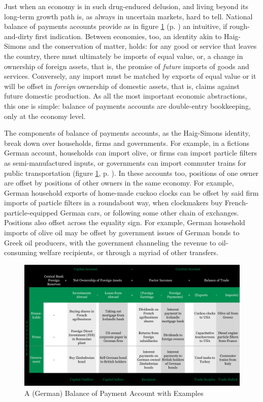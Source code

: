 \documentclass[11pt,a4paper,oneside,openright]{article}
\begin{document}
Just when an economy is in such drug-enduced delusion, and living beyond its long-term growth path is, as always in uncertain markets, hard to tell. 
National balance of payments accounts provide as in figure \ref{fig:balance-of-payments} (p. \pageref{fig:balance-of-payments}) an intuitive, if rough-and-dirty first indication. 
Between economies, too, an identity akin to Haig-Simons and the conservation of matter, holds: 
for any good or service that leaves the country, there must ultimately be imports of equal value, or, a change in ownership of foreign assets, that is, the promise of \emph{future} imports of goods and services. 
Conversely, any import must be matched by exports of equal value or it will be offset in \emph{foreign} ownership of domestic assets, that is, claims against future domestic production. 
As all the most important economic abstractions, this one is simple: 
balance of payments accounts are double-entry bookkeeping, only at the economy level.  

The components of balance of payments accounts, as the Haig-Simons identity, break down over households, firms and governments. 
For example, in a fictions German account, households can import olive, or firms can import particle filters as semi-manufactured inputs, or governments can import commuter trains for public transportation (figure \ref{fig:balance-of-payments}, p. \pageref{fig:balance-of-payments}). 
In these accounts too, positions of one owner are offset by positions of other owners in the same economy. 
For example, German household exports of home-made cuckoo clocks can be offset by said firm imports of particle filters in a roundabout way, when clockmakers buy French-particle-equipped German cars, or following some other chain of exchanges. 
Positions  also offset across the equality sign. 
For example, German household imports of olive oil may be offset by government issues of German bonds to Greek oil producers, with the government channeling the revenue to oil-consuming welfare recipients, or through a myriad of other transfers.

\begin{figure}[htbp]
	\begin{center}
	\includegraphics[width=1\textwidth]{./img/balance-of-payments}  
	\caption{A (German) Balance of Payment Account with Examples}
	\label{fig:balance-of-payments}
	\end{center}
\end{figure}
\end{document}
